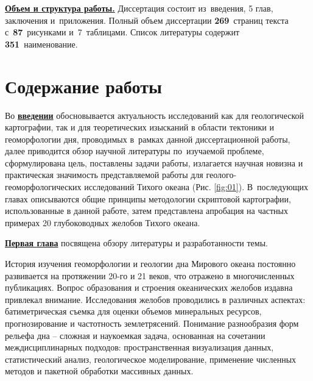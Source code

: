 

\underline{\textbf{Объем и структура работы.}} Диссертация состоит из~введения,
5 глав, заключения и~приложения. Полный объем диссертации
\textbf{269}~страниц текста с~\textbf{87}~рисунками и~7~таблицами. Список
литературы содержит \textbf{351}~наименование.

\section*{Содержание работы}
Во \underline{\textbf{введении}} обосновывается актуальность исследований как для геологической картографии, так и для теоретических изысканий в области тектоники и геоморфологии дня, проводимых в~рамках данной диссертационной работы, далее 
приводится обзор научной литературы по~изучаемой проблеме, сформулирована цель, поставлены задачи работы, излагается научная новизна и практическая значимость представляемой работы для геолого-геоморфологических исследований Тихого океана (Рис. \ref{fig:01}). В~последующих главах описываются общие принципы методологии скриптовой картографии, использованные в данной работе, затем представлена апробация на частных примерах 20 глубоководных желобов Тихого океана.

\underline{\textbf{Первая глава}} посвящена обзору литературы и разработанности темы.

История изучения геоморфологии и геологии дна Мирового океана постоянно развивается на протяжении 20-го и 21 веков, что отражено в многочисленных публикациях. Вопрос образования и строения океанических желобов издавна привлекал внимание. Исследования желобов проводились в различных аспектах: батиметрическая съемка для оценки объемов минеральных ресурсов, прогнозирование и частотность землетрясений. Понимание разнообразия форм рельефа дна – сложная и наукоемкая задача, основанная на сочетании междисциплинарных подходов: пространственная визуализация данных, статистический анализ, геологическое моделирование, применение численных методов и пакетной обработки массивных данных. 

